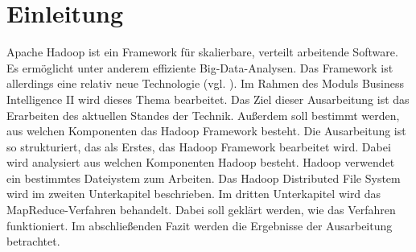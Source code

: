\section{Einleitung}
Apache Hadoop ist ein Framework für skalierbare, verteilt arbeitende Software. Es ermöglicht unter anderem effiziente Big-Data-Analysen. Das Framework ist allerdings eine relativ neue Technologie (vgl. \cite{avn}). Im Rahmen des Moduls \glqq Business Intelligence II\grqq{} wird dieses Thema bearbeitet. Das Ziel dieser Ausarbeitung ist das Erarbeiten des aktuellen Standes der Technik. Außerdem soll bestimmt werden, aus welchen Komponenten das Hadoop Framework besteht. Die Ausarbeitung ist so strukturiert, das als Erstes, das Hadoop Framework bearbeitet wird. Dabei wird analysiert aus welchen Komponenten Hadoop besteht. Hadoop verwendet ein bestimmtes Dateiystem zum Arbeiten. Das Hadoop Distributed File System wird im zweiten Unterkapitel beschrieben. Im dritten Unterkapitel wird das MapReduce-Verfahren behandelt. Dabei soll geklärt werden, wie das Verfahren funktioniert. Im abschließenden Fazit werden die Ergebnisse der Ausarbeitung betrachtet.